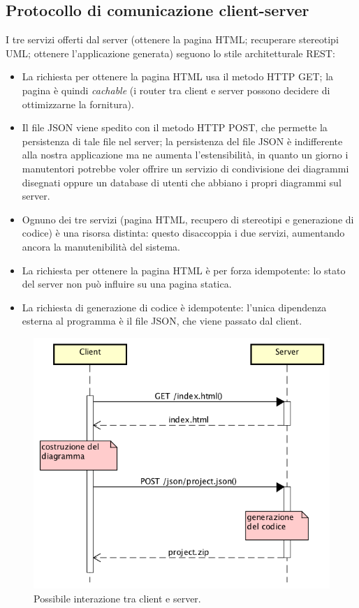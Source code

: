 


\subsection{Protocollo di comunicazione client-server} \label{sec:arch_proto}
I tre servizi offerti dal server (ottenere la pagina HTML; recuperare stereotipi UML; ottenere l'applicazione generata) seguono lo stile architetturale REST:
\begin{itemize}
	\item La richiesta per ottenere la pagina HTML usa il metodo HTTP GET; la pagina è quindi \emph{cachable} (i router tra client e server possono decidere di ottimizzarne la fornitura).
	\item Il file JSON viene spedito con il metodo HTTP POST, che permette la persistenza di tale file nel server; la persistenza del file JSON è indifferente alla nostra applicazione ma ne aumenta l'estensibilità, in quanto un giorno i manutentori potrebbe voler offrire un servizio di condivisione dei diagrammi disegnati oppure un database di utenti che abbiano i propri diagrammi sul server.
	\item Ognuno dei tre servizi (pagina HTML, recupero di stereotipi e generazione di codice) è una risorsa distinta: questo disaccoppia i due servizi, aumentando ancora la manutenibilità del sistema.
	\item La richiesta per ottenere la pagina HTML è per forza idempotente: lo stato del server non può influire su una pagina statica. %
	\item La richiesta di generazione di codice è idempotente: l'unica dipendenza esterna al programma è il file JSON, che viene passato dal client.
\end{itemize}

\begin{figure} \label{fig:protocol}
	\includegraphics[scale=0.66]{img/http}
	\caption{Possibile interazione tra client e server.}
\end{figure}

